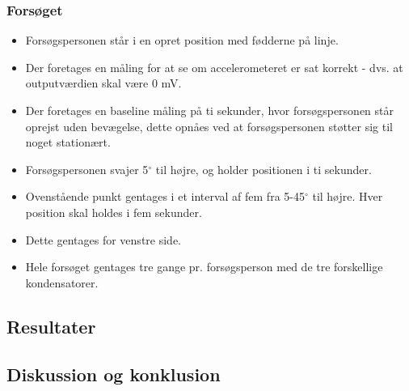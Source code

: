\subsubsection{Forsøget}
\begin{itemize}
\item Forsøgspersonen står i en opret position med fødderne på linje.
\item Der foretages en måling for at se om accelerometeret er sat korrekt - dvs. at outputværdien skal være 0 mV. %
\item Der foretages en baseline måling på ti sekunder, hvor forsøgspersonen står oprejst uden bevægelse, dette opnåes ved at forsøgspersonen støtter sig til noget stationært.
\item Forsøgspersonen svajer 5${^\circ}$ til højre, og holder positionen i ti sekunder.
\item Ovenstående punkt gentages i et interval af fem fra 5-45${^\circ}$ til højre. Hver position skal holdes i fem sekunder.
\item Dette gentages for venstre side.
\item Hele forsøget gentages tre gange pr. forsøgsperson med de tre forskellige kondensatorer.
\end{itemize}

\subsection{Resultater}

\subsection{Diskussion og konklusion}